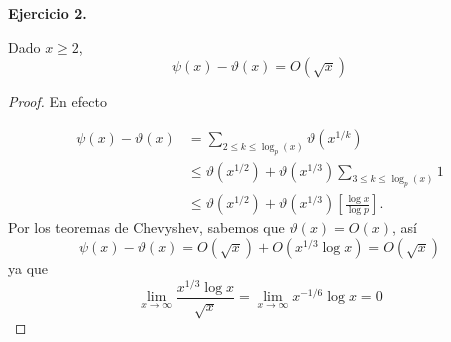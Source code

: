 \documentclass[12pt, a4paper]{article}
\begin{document}
\textbf{Ejercicio 2.}
\begin{theorem}
    Dado $x\geq 2$,
    $$\psi(x)-\vartheta(x)=O(\sqrt{x})$$
\end{theorem}

\begin{proof}
  En efecto

  \begin{align*}
    \psi(x)-\vartheta(x)&=\sum_{2\leq k\leq \log_p(x)}\vartheta(x^{1/k})\\
    &\leq\vartheta(x^{1/2})+\vartheta(x^{1/3})\sum_{3\leq k\leq \log_p(x)}1\\
    &\leq\vartheta(x^{1/2})+\vartheta(x^{1/3})\left[\frac{\log x}{\log p}\right]
  .\end{align*}
Por los teoremas de Chevyshev, sabemos que $\vartheta(x)=O(x)$, así
$$
\psi(x)-\vartheta(x)=O(\sqrt{x})+O(x^{1/3}\log x)=O(\sqrt{x})
$$
ya que
$$\lim_{x \to \infty} \dfrac{x^{1/3}\log x}{\sqrt{x}}=\lim_{x \to \infty}x^{-1/6}\log x=0$$
\end{proof}
\end{document}
